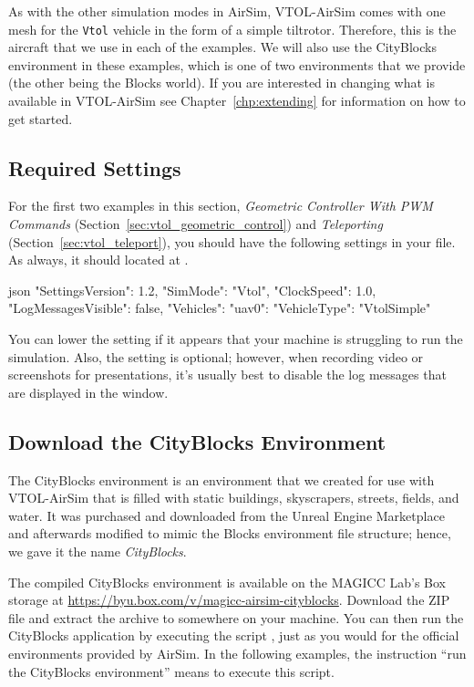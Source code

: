 As with the other simulation modes in AirSim, VTOL-AirSim comes with one mesh for the \verb|Vtol| vehicle in the form of a simple tiltrotor. Therefore, this is the aircraft that we use in each of the examples. We will also use the CityBlocks environment in these examples, which is one of two environments that we provide (the other being the Blocks world). If you are interested in changing what is available in VTOL-AirSim see Chapter~\ref{chp:extending} for information on how to get started.

\subsection{Required Settings}
For the first two examples in this section, \textit{Geometric Controller With PWM Commands} (Section~\ref{sec:vtol_geometric_control}) and \textit{Teleporting} (Section~\ref{sec:vtol_teleport}), you should have the following settings in your  file. As always, it should located at .
\begin{minttcb}[title={Required Settings for eVTOL Examples}]{json}
{
  "SettingsVersion": 1.2,
  "SimMode": "Vtol",
  "ClockSpeed": 1.0,
  "LogMessagesVisible": false,
  "Vehicles": {
    "uav0": {
      "VehicleType": "VtolSimple"
    }
  }
}
\end{minttcb}

You can lower the  setting if it appears that your machine is struggling to run the simulation. Also, the setting  is optional; however, when recording video or screenshots for presentations, it's usually best to disable the log messages that are displayed in the window.

\subsection{Download the CityBlocks Environment}\label{sec:download_cityblocks}
The CityBlocks environment is an environment that we created for use with VTOL-AirSim that is filled with static buildings, skyscrapers, streets, fields, and water. It was purchased and downloaded from the Unreal Engine Marketplace and afterwards modified to mimic the Blocks environment file structure; hence, we gave it the name \textit{CityBlocks}.

The compiled CityBlocks environment is available on the MAGICC Lab's Box storage at \url{https://byu.box.com/v/magicc-airsim-cityblocks}. Download the ZIP file and extract the archive to somewhere on your machine. You can then run the CityBlocks application by executing the script , just as you would for the official environments provided by AirSim. In the following examples, the instruction ``run the CityBlocks environment'' means to execute this script.

